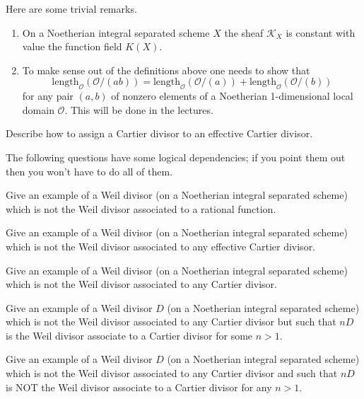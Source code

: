 \begin{remarks}
Here are some trivial remarks.
\begin{enumerate}
\item On a Noetherian integral separated scheme $X$ the 
sheaf ${\mathcal K}_X$ is constant with value the function field $K(X)$.
\item To make sense out of the definitions above one needs
to show that
$$
\text{length}_{\mathcal O}({\mathcal O}/(ab)) =
\text{length}_{\mathcal O}({\mathcal O}/(a)) +
\text{length}_{\mathcal O}({\mathcal O}/(b))
$$
for any pair $(a,b)$ of nonzero elements of a Noetherian 1-dimensional
local domain ${\mathcal O}$. This will be done in the lectures.
\end{enumerate}
\end{remarks}

\begin{exercise}
Describe how to assign a Cartier divisor
to an effective Cartier divisor.
\end{exercise}

\noindent
The following questions have some logical dependencies; if you point them
out then you won't have to do all of them.

\begin{exercise}
Give an example of a Weil divisor
(on a Noetherian integral separated scheme) which is not
the Weil divisor associated to a rational function.
\end{exercise}

\begin{exercise}
Give an example of a Weil divisor
(on a Noetherian integral separated scheme) which is not
the Weil divisor associated to any effective Cartier divisor.
\end{exercise}

\begin{exercise}
Give an example of a Weil divisor
(on a Noetherian integral separated scheme) which is not
the Weil divisor associated to any Cartier divisor.
\end{exercise}

\begin{exercise}
Give an example of a Weil divisor $D$
(on a Noetherian integral separated scheme) which is not
the Weil divisor associated to any Cartier divisor but
such that $nD$ is the Weil divisor associate to a Cartier
divisor for some $n>1$.
\end{exercise}

\begin{exercise}
Give an example of a Weil divisor $D$
(on a Noetherian integral separated scheme) which is not
the Weil divisor associated to any Cartier divisor and
such that $nD$ is NOT the Weil divisor associate to a Cartier
divisor for any $n>1$.
\end{exercise}

